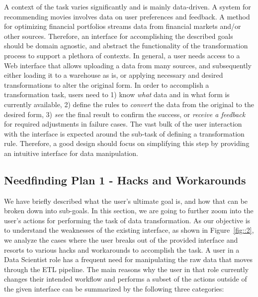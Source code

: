 \documentclass[12pt,letterpaper]{article}
\begin{document}
A context of the task varies significantly and is mainly data-driven. A system for recommending movies involves data on user preferences and feedback. A method for optimizing financial portfolios streams data from financial markets and/or other sources. Therefore, an interface for accomplishing the described goals should be domain agnostic, and abstract the functionality of the transformation process to support a plethora of contexts. In general, a user needs access to a Web interface that allows uploading a data from many sources, and subsequently either loading it to a warehouse as is, or applying necessary and desired transformations to alter the original form. In order to accomplish a transformation task, users need to 1) know \textit{what} data and in what form is currently available, 2) define the rules to \textit{convert} the data from the original to the desired form, 3) \textit{see} the final result to confirm the success, or \textit{receive a feedback} for required adjustments in failure cases. The vast bulk of the user interaction with the interface is expected around the sub-task of defining a transformation rule. Therefore, a good design should focus on simplifying this step by providing an intuitive interface for data manipulation.


\subsection*{Needfinding Plan 1 - Hacks and Workarounds}
We have briefly described what the user's ultimate goal is, and how that can be broken down into sub-goals. In this section, we are going to further zoom into the user's actions for performing the task of data transformation. As our objective is to understand the weaknesses of the existing interface, as shown in Figure~\ref{fig::2}, we analyze the cases where the user breaks out of the provided interface and resorts to various hacks and workarounds to accomplish the task. A user in a Data Scientist role has a frequent need for manipulating the raw data that moves through the ETL pipeline. The main reasons why the user in that role currently changes their intended workflow and performs a subset of the actions outside of the given interface can be summarized by the following three categories: 
\end{document}
